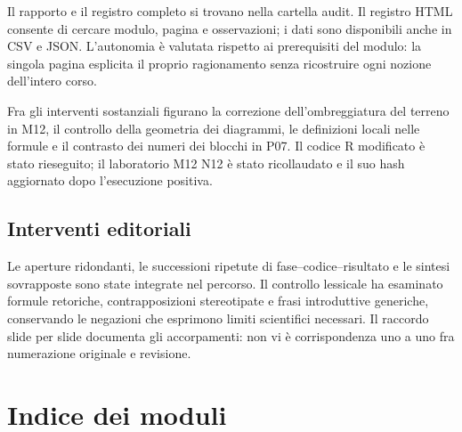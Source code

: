 \documentclass[11pt,a4paper]{article}
\begin{document}
Il rapporto e il registro completo si trovano nella cartella audit. Il registro HTML consente di cercare modulo, pagina e osservazioni; i dati sono disponibili anche in CSV e JSON. L’autonomia è valutata rispetto ai prerequisiti del modulo: la singola pagina esplicita il proprio ragionamento senza ricostruire ogni nozione dell’intero corso.

Fra gli interventi sostanziali figurano la correzione dell’ombreggiatura del terreno in M12, il controllo della geometria dei diagrammi, le definizioni locali nelle formule e il contrasto dei numeri dei blocchi in P07. Il codice R modificato è stato rieseguito; il laboratorio M12 N12 è stato ricollaudato e il suo hash aggiornato dopo l’esecuzione positiva.

\subsection*{Interventi editoriali}

Le aperture ridondanti, le successioni ripetute di fase–codice–risultato e le sintesi sovrapposte sono state integrate nel percorso. Il controllo lessicale ha esaminato formule retoriche, contrapposizioni stereotipate e frasi introduttive generiche, conservando le negazioni che esprimono limiti scientifici necessari. Il raccordo slide per slide documenta gli accorpamenti: non vi è corrispondenza uno a uno fra numerazione originale e revisione.

\newpage\section*{Indice dei moduli}
\end{document}
